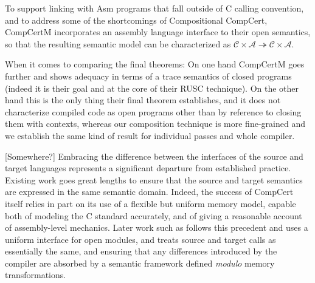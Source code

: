 \documentclass[sigplan,10pt,review,anonymous]{acmart}\settopmatter{printfolios=true,printccs=false,printacmref=false}
\begin{document}
To support linking with Asm programs that fall outside of
C calling convention,
and to address some of the shortcomings of Compositional CompCert,
CompCertM incorporates an assembly language interface
to their open semantics,
so that the resulting semantic model can be characterized as
$\mathcal{C} \times \mathcal{A} \twoheadrightarrow
 \mathcal{C} \times \mathcal{A}$.

When it comes to comparing the final theorems:
On one hand CompCertM goes further
and shows adequacy in terms of a trace semantics of closed programs
(indeed it is their goal and at the core of their RUSC technique).
On the other hand this is the only thing
their final theorem establishes,
and it does not characterize
compiled code as open programs
other than by reference to closing them with contexts,
whereas
our composition technique is more fine-grained and
we establish the same kind of result
for individual passes and whole compiler.



\vspace{2em}
[Somewhere?]
Embracing the difference between the interfaces of
the source and target languages
represents a significant departure from established practice.
Existing work goes great lengths
to ensure that the source and target semantics
are expressed in the same semantic domain.
Indeed,
the success of CompCert itself
relies in part on its use of a flexible
but uniform memory model,
capable both of modeling the C standard accurately,
and of giving a reasonable account
of assembly-level mechanics.
Later work such as \cite{compcompcert,cpp15}
follows this precedent and uses
a uniform interface for open modules,
and treats source and target calls
as essentially the same,
and ensuring that any differences introduced by the compiler
are absorbed by a semantic framework
defined \emph{modulo} memory transformations.




\end{document}
